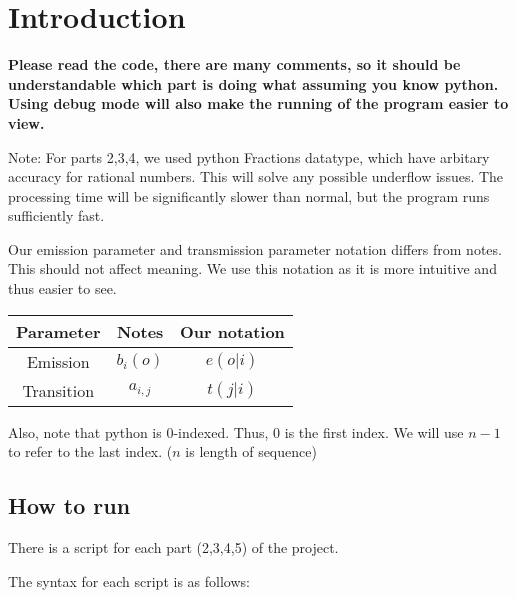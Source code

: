 \documentclass[12pt]{article}
\begin{document}
\maketitle

\section{Introduction}

\textbf{Please read the code, there are many comments, so it should be understandable which part is doing what assuming you know python. Using debug mode will also make the running of the program easier to view.}

Note: For parts 2,3,4, we used python Fractions datatype, which have arbitary accuracy for rational numbers. This will solve any possible underflow issues. The processing time will be significantly slower than normal, but the program runs sufficiently fast.

Our emission parameter and transmission parameter notation differs from notes. This should not affect meaning. We use this notation as it is more intuitive and thus easier to see.
\begin{center}
\begin{tabular}{|c|c|c|}
\hline \rule{0pt}{1em}
Parameter  & Notes & Our notation \\
\hline \rule{0pt}{1em}
Emission   & \(b_i(o)\) & \(e(o|i)\) \\
\hline \rule{0pt}{1em}
Transition & \(a_{i,j}\) & \(t(j|i)\) \\
\hline
\end{tabular}
\end{center}

Also, note that python is 0-indexed. Thus, 0 is the first index. We will use \(n-1\) to refer to the last index. (\(n\) is length of sequence)

\subsection{How to run}
There is a script for each part (2,3,4,5) of the project.

The syntax for each script is as follows:
\end{document}
